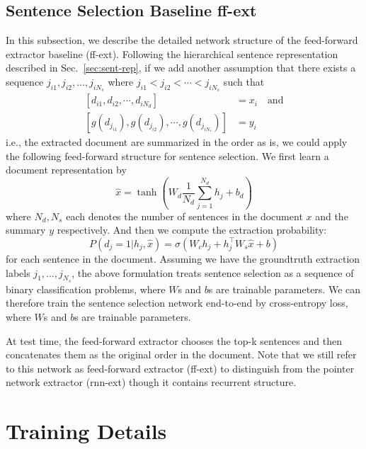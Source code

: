 \documentclass[11pt,a4paper]{article}
\def\secref#1{Sec.~\ref{#1}}
\begin{document}
\subsection{Sentence Selection Baseline ff-ext}
\label{sec:ff-ext}
In this subsection, we describe the detailed network structure of the feed-forward extractor baseline (ff-ext).
Following the hierarchical sentence representation described in \secref{sec:sent-rep}, 
if we add another assumption that there exists a sequence
$j_{i1}, j_{i2}, \dots, j_{iN_s}$ where
$j_{i1} < j_{i2} < \cdots < j_{iN_s}$ such that 
\begin{align}
\label{eq:order}
 [d_{i1}, d_{i2}, \cdots, d_{iN_d}] &= x_i
 \quad \text{and} \nonumber \\
 [g(d_{j_{i1}}), g(d_{j_{i2}}), \cdots, g(d_{j_{iN_s}})] &= y_i
\end{align}
i.e., the extracted document are summarized in the order as is,
we could apply the following feed-forward structure for sentence selection.
We first learn a document representation by
\begin{equation}
\hat{x} = \tanh(W_d\frac{1}{N_d}\sum_{j=1}^{N_d}h_j + b_d)
\end{equation}
where $N_d, N_s$ each denotes the number of sentences in the document $x$ and the summary $y$ respectively. 
And then we compute the extraction probability:
$$ 
P(d_j = 1 | h_j, \hat{x})
= \sigma (W_ch_j + h_j^\top W_s\hat{x} + b)
$$
for each sentence in the document.
Assuming we have the groundtruth extraction labels 
$j_1, \dots, j_{N_s}$, 
the above formulation treats sentence selection as a sequence of 
binary classification problems, where $W$s and $b$s are trainable parameters. 
We can therefore train the sentence selection network end-to-end by cross-entropy loss, where $W$s and $b$s are trainable parameters. 

At test time, the feed-forward extractor chooses the top-k sentences and then concatenates them as the original order in the document.
Note that we still refer to this network as feed-forward extractor (ff-ext) to distinguish from the pointer network extractor (rnn-ext) though it contains recurrent structure.


\section{Training Details}
\end{document}
